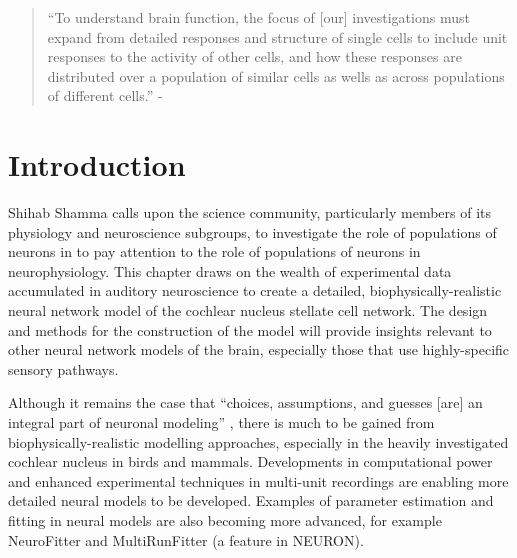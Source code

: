 

\begin{quotation}
  ``To understand brain function, the focus of [our] investigations must
  expand from detailed responses and structure of single cells to
  include unit responses to the activity of other cells, and how these
  responses are distributed over a population of similar cells as
  wells as across populations of different cells.''  - \emph{\citet[,p.TODO]{Shamma:1998}}
\end{quotation}


\section{Introduction}

Shihab Shamma calls upon the science community, particularly members
of its physiology and neuroscience subgroups, to investigate the role
of populations of neurons in to pay attention to the role of
populations of neurons in neurophysiology. This chapter draws on the wealth of experimental data accumulated in auditory
neuroscience to create a detailed, biophysically-realistic
neural network model of the cochlear nucleus stellate cell network.  The
design and methods for the construction of the model will provide
insights relevant to other neural network models of the brain, especially those
that use highly-specific sensory pathways.  

\medskip{}

Although it remains the case that ``choices, assumptions, and guesses [are] an
integral part of neuronal modeling'' \citep[]{SegevBurkeEtAl:1998}, there is much to be gained from
biophysically-realistic modelling approaches, especially in the heavily
investigated cochlear nucleus in birds and mammals. Developments in
computational power and enhanced experimental techniques in multi-unit
recordings are enabling more detailed neural models to be developed. Examples of parameter
estimation and fitting in neural models are also becoming more advanced, for
example NeuroFitter \citep{VanAchardEtAl:2007} and MultiRunFitter (a feature in
NEURON).

